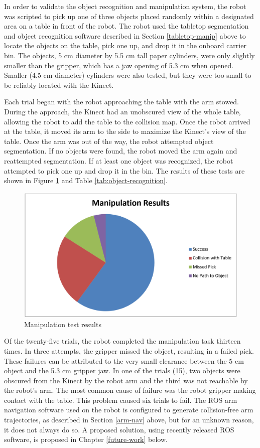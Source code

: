 \documentclass[]{cwru} %
\begin{document}
In order to validate the object recognition and manipulation system, the
robot was scripted to pick up one of three objects placed randomly
within a designated area on a table in front of the robot. The robot
used the tabletop segmentation and object recognition software described
in Section \ref{tabletop-manip} above to locate the objects on the table, pick one up,
and drop it in the onboard carrier bin. The objects, 5 cm diameter by
5.5 cm tall paper cylinders, were only slightly smaller than the
gripper, which has a jaw opening of 5.3 cm when opened. Smaller (4.5 cm
diameter) cylinders were also tested, but they were too small to be
reliably located with the Kinect.

Each trial began with the robot approaching the table with the arm
stowed. During the approach, the Kinect had an unobscured view of the
whole table, allowing the robot to add the table to the collision map.
Once the robot arrived at the table, it moved its arm to the side to
maximize the Kinect's view of the table. Once the arm was out of the
way, the robot attempted object segmentation. If no objects were found,
the robot moved the arm again and reattempted segmentation. If at least
one object was recognized, the robot attempted to pick one up and drop
it in the bin. The results of these tests are shown in Figure 
\ref{fig:results-pie} and Table \ref{tab:object-recognition}.

\begin{figure}[ht]
\centering
\includegraphics[width=6.0in]{manipulation_results}
\caption{Manipulation test results}
\label{fig:results-pie}
\end{figure}

Of the twenty-five trials, the robot completed the manipulation task
thirteen times. In three attempts, the gripper missed the object,
resulting in a failed pick. These failures can be attributed to the very
small clearance between the 5 cm object and the 5.3 cm gripper jaw. In
one of the trials (15), two objects were obscured from the Kinect by the
robot arm and the third was not reachable by the robot's arm. The most
common cause of failure was the robot gripper making contact with the
table. This problem caused six trials to fail. The ROS arm navigation
software used on the robot is configured to generate collision-free arm
trajectories, as described in Section \ref{arm-nav} above, but for an unknown
reason, it does not always do so. A proposed solution, using recently
released ROS software, is proposed in Chapter \ref{future-work} below.
\end{document}
